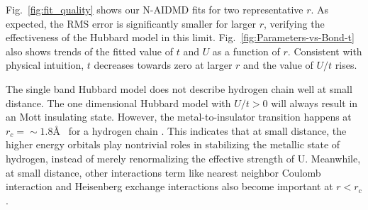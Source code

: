 Fig.~\ref{fig:fit_quality} shows our N-AIDMD fits for two representative $r$. As expected, the RMS error 
is significantly smaller for larger $r$, verifying the effectiveness of the Hubbard model 
in this limit. Fig.~\ref{fig:Parameters-vs-Bond-t} also shows trends of the fitted value of $t$ 
and $U$ as a function of $r$. Consistent with physical intuition, $t$ decreases towards zero at larger $r$
and the value of $U/t$ rises. 

The single band Hubbard model does not describe hydrogen chain well at small distance. The one dimensional Hubbard model with $U/t>0$ will always result in an Mott insulating state. However, the metal-to-insulator transition happens at $r_c=\sim1.8$\AA~ for a hydrogen chain \cite{Stella2011}. This indicates that at small distance, the higher energy orbitals play nontrivial roles in stabilizing the metallic state of hydrogen, instead of merely renormalizing the effective strength of U. Meanwhile, at small distance, other interactions term like nearest neighbor Coulomb interaction and Heisenberg exchange interactions also become important at $r<r_c$ \cite{ZhengThesis}. 

